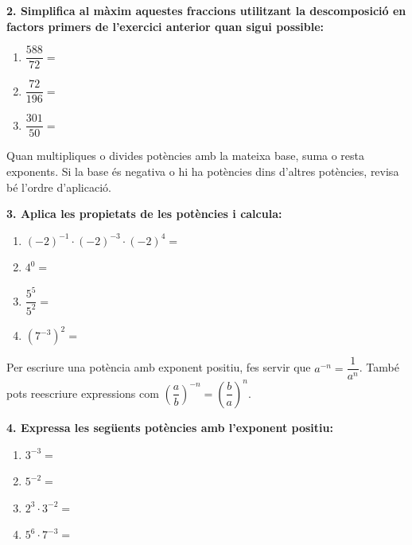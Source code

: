 \documentclass[12pt,a4paper]{article}
\begin{document}
\textbf{2. Simplifica al màxim aquestes fraccions utilitzant la descomposició en factors primers de l’exercici anterior quan sigui possible:}

\begin{enumerate}[label=\alph*)]
    \item $\dfrac{588}{72} =$ \vspace{1cm}
    \item $\dfrac{72}{196} =$ \vspace{1cm}
    \item $\dfrac{301}{50} =$ \vspace{1cm}
\end{enumerate}

\begin{capsula}
Quan multipliques o divides potències amb la mateixa base, suma o resta exponents. Si la base és negativa o hi ha potències dins d'altres potències, revisa bé l'ordre d'aplicació.
\end{capsula}

\textbf{3. Aplica les propietats de les potències i calcula:}
\begin{enumerate}[label=\alph*)]
    \item $(-2)^{-1}\cdot(-2)^{-3}\cdot(-2)^4 =$ \vspace{0.8cm}
    \item $4^0 =$ \vspace{0.8cm}
    \item $\dfrac{5^5}{5^2} =$ \vspace{0.8cm}
    \item $(7^{-3})^2 =$ \vspace{0.8cm}
\end{enumerate}

\newpage
\begin{capsula}
Per escriure una potència amb exponent positiu, fes servir que $a^{-n}=\dfrac{1}{a^n}$. També pots reescriure expressions com $\left(\dfrac{a}{b}\right)^{-n}=\left(\dfrac{b}{a}\right)^n$.
\end{capsula}

\textbf{4. Expressa les següents potències amb l’exponent positiu:}
\begin{enumerate}[label=\alph*)]
    \item $3^{-3} =$ \vspace{0.8cm}
    \item $5^{-2} =$ \vspace{0.8cm}
    \item $2^3\cdot 3^{-2} =$ \vspace{0.8cm}
    \item $5^6\cdot 7^{-3} =$ \vspace{0.8cm}
\end{enumerate}
\end{document}
